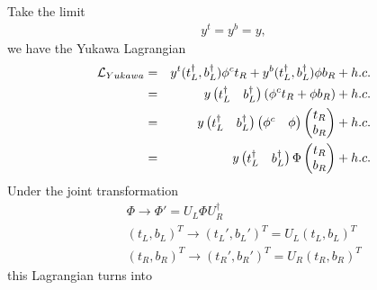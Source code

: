 \documentclass[11pt]{article}
\begin{document}
\section{ }
Take the limit
\begin{eqnarray}
    y^t = y^b = y,
  \end{eqnarray}
we have the Yukawa Lagrangian
\begin{eqnarray}
    {\cal L}_{Yukawa}  &=&  y^t (t_L^\dagger,b_L^\dagger) \phi^c t_R
    + y^b (t_L^\dagger,b_L^\dagger) \phi   b_R
    + h.c. \\ &=& y
    \begin{pmatrix}
      t_L^\dagger & b_L^\dagger
    \end{pmatrix}
    (\phi^c t_R + \phi b_R) + h.c. \\
    &=& y 
    \begin{pmatrix}
      t_L^\dagger & b_L^\dagger
    \end{pmatrix}
    \begin{pmatrix}
      \phi^c & \phi
    \end{pmatrix}
    \begin{pmatrix}
      t_R \\ b_R
    \end{pmatrix}+h.c.\\
    &=& y 
    \begin{pmatrix}
      t_L^\dagger & b_L^\dagger
    \end{pmatrix}
    \Phi
    \begin{pmatrix}
      t_R \\ b_R
    \end{pmatrix} +h.c.
  \end{eqnarray}
Under the joint transformation
\begin{eqnarray}
    &&\Phi \to \Phi' = U_L \Phi U_R^\dagger \\
    &&(t_L, b_L)^T \to (t_L', b_L')^T = U_L (t_L, b_L)^T  \\
    &&(t_R, b_R)^T \to  (t_R', b_R')^T = U_R (t_R, b_R)^T 
\end{eqnarray}
this Lagrangian turns into 
\end{document}
